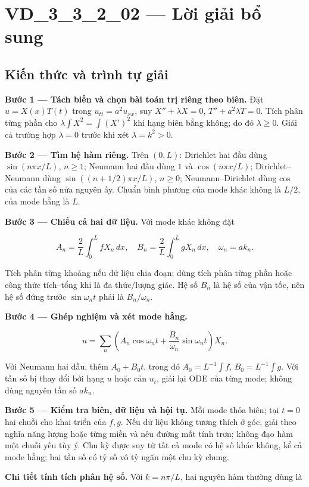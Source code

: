 \documentclass[10pt,a4paper]{article}
\begin{document}
\section*{VD\_3\_3\_2\_02 — Lời giải bổ sung}
\subsection*{Kiến thức và trình tự giải}
\textbf{Bước 1 — Tách biến và chọn bài toán trị riêng theo biên.} Đặt $u=X(x)T(t)$ trong $u_{tt}=a^2u_{xx}$, suy $X''+\lambda X=0$, $T''+a^2\lambda T=0$. Tích phân từng phần cho $\lambda\int X^2=\int (X')^2$ khi hạng biên bằng không; do đó $\lambda\ge0$. Giải cả trường hợp $\lambda=0$ trước khi xét $\lambda=k^2>0$.

\textbf{Bước 2 — Tìm hệ hàm riêng.} Trên $(0,L)$: Dirichlet hai đầu dùng $\sin(n\pi x/L)$, $n\ge1$; Neumann hai đầu dùng $1$ và $\cos(n\pi x/L)$; Dirichlet–Neumann dùng $\sin((n+1/2)\pi x/L)$, $n\ge0$; Neumann–Dirichlet dùng cos của các tần số nửa nguyên ấy. Chuẩn bình phương của mode khác không là $L/2$, của mode hằng là $L$.

\textbf{Bước 3 — Chiếu cả hai dữ liệu.} Với mode khác không đặt


\[
A_n=\frac2L\int_0^L fX_n\,dx,\quad B_n=\frac2L\int_0^L gX_n\,dx,\quad \omega_n=ak_n.
\]


Tích phân từng khoảng nếu dữ liệu chia đoạn; dùng tích phân từng phần hoặc công thức tích–tổng khi là đa thức/lượng giác. Hệ số $B_n$ là hệ số của vận tốc, nên hệ số đứng trước $\sin\omega_nt$ phải là $B_n/\omega_n$.

\textbf{Bước 4 — Ghép nghiệm và xét mode hằng.}


\[
u=\sum_n\left(A_n\cos\omega_nt+\frac{B_n}{\omega_n}\sin\omega_nt\right)X_n.
\]


Với Neumann hai đầu, thêm $A_0+B_0t$, trong đó $A_0=L^{-1}\int f$, $B_0=L^{-1}\int g$. Với tần số bị thay đổi bởi hạng $u$ hoặc cản $u_t$, giải lại ODE của từng mode; không dùng nguyên tần số $ak_n$.

\textbf{Bước 5 — Kiểm tra biên, dữ liệu và hội tụ.} Mỗi mode thỏa biên; tại $t=0$ hai chuỗi cho khai triển của $f,g$. Nếu dữ liệu không tương thích ở góc, giải theo nghĩa năng lượng hoặc từng miền và nêu đường mất tính trơn; không đạo hàm một chuỗi yếu tùy ý. Chu kỳ được suy từ tất cả mode có hệ số khác không, kể cả mode hằng; hai tần số có tỷ số vô tỷ ngăn một chu kỳ chung.

\textbf{Chi tiết tính tích phân hệ số.} Với $k=n\pi/L$, hai nguyên hàm thường dùng là
\end{document}
